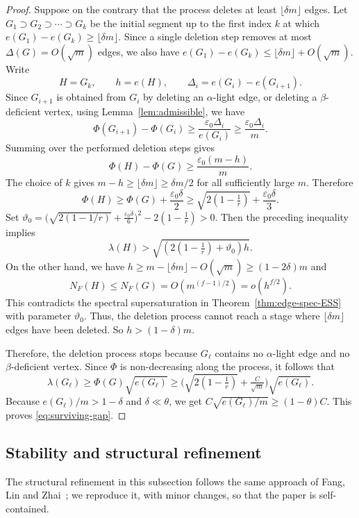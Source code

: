 \documentclass[11pt,a4paper]{article}
\theoremstyle{definition}
\theoremstyle{plain}
\newcommand{\eps}{\varepsilon}
\renewcommand{\le}{\leqslant}
\renewcommand{\ge}{\geqslant}
\begin{document}
\begin{proof}
Suppose on the contrary that the process deletes at least $\lfloor\delta m\rfloor$ edges. Let $G_{1}\supset G_{2}\supset\cdots\supset G_{k}$ be the initial segment up to the first index $k$ at which $e(G_{1})-e(G_{k})\ge\lfloor\delta m\rfloor$. Since a single deletion step removes at most $\Delta(G)=O(\sqrt m)$ edges, we also have $e(G_{1})-e(G_{k})\le\lfloor\delta m\rfloor+O(\sqrt m)$.   
 Write
\[  H=G_k,
  \qquad
  h=e(H), \qquad 
  \Delta_i=e(G_i)-e(G_{i+1}).
\]
Since $G_{i+1}$ is obtained from $G_i$ by deleting an $\alpha$-light edge, or deleting a $\beta$-deficient vertex, using Lemma~\ref{lem:admissible}, we have 
\[
  \Phi(G_{i+1})-\Phi(G_i)
  \ge \frac{\eps_0\Delta_i}{e(G_i)}
  \ge \frac{\eps_0\Delta_i}{m}.
\]
Summing over 
the performed deletion steps gives
\[
  \Phi(H)-\Phi(G)\ge \frac{\eps_0(m-h)}m.
\]
The choice of $k$ gives $m-h\ge\lfloor\delta m\rfloor\ge\delta m/2$ for all sufficiently large $m$.  Therefore
\[
  \Phi(H)
  \ge \Phi(G)+\frac{\eps_0\delta}{2}
  \ge \sqrt{2\left(1- \tfrac{1}{r}\right)}+\frac{\eps_0\delta}{3}. 
\]
Set $  \vartheta_0=\big(\sqrt{2(1-1/r)}+\frac{\eps_0\delta}{6}\big)^2-2(1-\frac1r)>0$. 
Then the preceding inequality implies
\[
  \lambda(H)>\sqrt{\left(2\left(1-\tfrac1r \right)+\vartheta_0 \right)h}.
\]
On the other hand, we have $h\ge m-\lfloor\delta m\rfloor-O(\sqrt m)\ge(1-2\delta)m$ and
\[
  N_F(H)\le N_F(G)=O(m^{(f-1)/2})=o(h^{f/2}).
\]
This contradicts the spectral supersaturation in Theorem~\ref{thm:edge-spec-ESS} with parameter $\vartheta_0$.  Thus, the deletion process cannot reach a stage where $\lfloor\delta m\rfloor$ edges have been deleted. So $h>(1-\delta)m$. 


Therefore, 
the deletion process stops because $G_{\ell}$ contains no $\alpha$-light edge and no $\beta$-deficient vertex.  
Since $\Phi$ is non-decreasing along the process, 
it follows that 
\[
  \lambda(G_{\ell}) 
  \ge \Phi(G)\sqrt{e(G_{\ell})}
  \ge \Big(\sqrt{2\left( 1- \tfrac{1}{r}\right)}+\tfrac C{\sqrt m}\Big)\sqrt{e(G_{\ell})}.
\]
Because $e(G_{\ell})/m>1-\delta$ and $\delta\ll\theta$,
we get $ C\sqrt{ e(G_{\ell}) /m}\ge (1-\theta)C$. 
This proves \eqref{eq:surviving-gap}. 
\end{proof}

\subsection{Stability and structural refinement}

The structural refinement in this
subsection follows the same approach of Fang,
Lin and Zhai~\cite{FLZ}; we reproduce it,
with minor changes, so that the paper is
self-contained.
\end{document}
